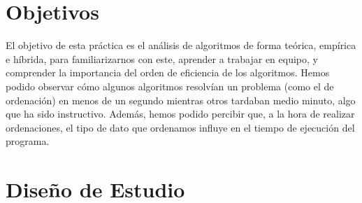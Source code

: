 \documentclass[12pt]{article}
\begin{document}
    
    \section{Objetivos}
    El objetivo de esta práctica es el análisis de algoritmos de forma teórica, empírica e híbrida, para familiarizarnos con este, aprender a trabajar en equipo, y comprender la importancia del orden de eficiencia de los algoritmos. Hemos podido observar cómo algunos algoritmos resolvían un problema (como el de ordenación) en menos de un segundo mientras otros tardaban medio minuto, algo que ha sido instructivo. Además, hemos podido percibir que, a la hora de realizar ordenaciones, el tipo de dato que ordenamos influye en el tiempo de ejecución del programa.

    
    \section{Diseño de Estudio}
\end{document}
